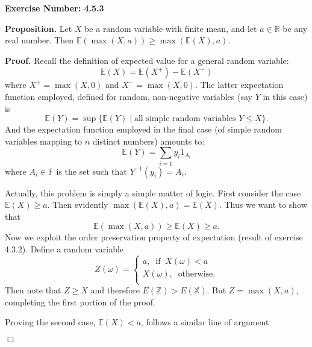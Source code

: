 \documentclass{article}
\begin{document}
\noindent \textbf{Exercise Number: 4.5.3}  %

\medskip 

\noindent \textbf{Proposition.} Let $X$ be a random variable with finite mean, and let $a \in \mathbb{R}$ be any real number. Then $\mathbb{E}(\max(X,a)) \geq \max(\mathbb{E}(X), a)$. 

\bigskip

\noindent \textbf{Proof.} Recall the definition of expected value for a general random variable: \[\mathbb{E}(X) = \mathbb{E}(X^+) - \mathbb{E}(X^-)\] where $X^+ = \max(X,0)$ and $X^- = \max(X,0)$. The latter expectation function employed, defined for random, non-negative variables (say $Y$ in this case) is \[\mathbb{E}(Y) = \sup\{\mathbb{E}(Y) \mid \text{all simple random variables }  Y \leq X\}.\] And the expectation function employed in the final case (of simple random variables mapping to $n$ distinct numbers) amounts to: \[\mathbb{E}(Y) = \sum_{i = 1} y_i 1_{A_i} \] where $A_i \in \mathbb{F}$ is the set such that $Y^{-1}(y_i) = A_i$.

Actually, this problem is simply a simple matter of logic. First consider the case $\mathbb{E}(X) \geq a$. Then evidently $\max(\mathbb{E}(X), a) = \mathbb{E}(X)$. Thus we want to show that \[\mathbb{E}(\max(X,a)) \geq \mathbb{E}(X) \geq a.\] Now we exploit the order preservation property of expectation (result of exercise 4.3.2). Define a random variable \[Z(\omega) = \begin{cases} a, \;\; \text{if} \;\; X(\omega) < a \\ X(\omega), \; \;\text{otherwise}.\\ \end{cases}\] Then note that $Z \geq X$ and therefore $E(\mathbb{Z}) > E(\mathbb{X})$. But $Z = \max(X,a)$, completing the first
portion of the proof. 



Proving the second case, $\mathbb{E}(X) < a$, follows a similar line of argument 

\hfill $\Box$
\end{document}
